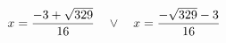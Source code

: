 \documentclass[preview]{standalone}
\begin{document}
\begin{align*}
\special{dvisvgm:raw <g id='unique000'>}x=\frac{-3 + \sqrt{329}}{16} \quad \lor \quad x=\frac{- \sqrt{329} - 3}{16}\special{dvisvgm:raw </g>}
\end{align*}
\end{document}
